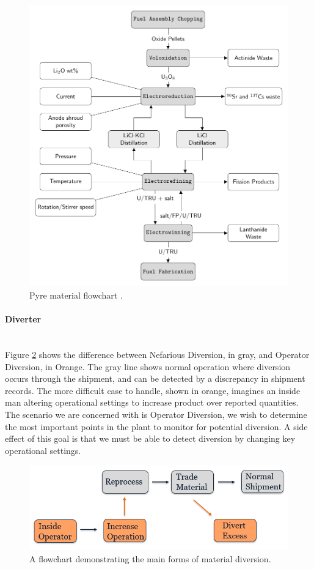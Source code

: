 \begin{figure}[h]
	\centering
	\includegraphics[width=0.9\linewidth]{images/flowchart}
	\caption{Pyre material flowchart \cite{borrelli_approaches_2017}.}
	\label{fig:flowchart}
\end{figure}

\paragraph{Diverter} \mbox{}\\
Figure \ref{fig:diverttype} shows the difference between Nefarious Diversion, in gray, and Operator Diversion, in Orange. The gray line shows normal operation where diversion occurs
through the shipment, and can be detected by a discrepancy in shipment records. The more difficult case to handle, shown in orange, imagines an inside man altering operational settings
to increase product over reported quantities. The scenario we are concerned with is Operator Diversion, we wish to determine the most important points in the plant to monitor for potential
diversion. A side effect of this goal is that we must be able to detect diversion by changing key operational settings.

\begin{figure}[h]
	\centering
	\includegraphics[width=0.8\linewidth]{images/westphal-diversion}
	\caption{A flowchart demonstrating the main forms of material diversion.}
	\label{fig:diverttype}
\end{figure}

